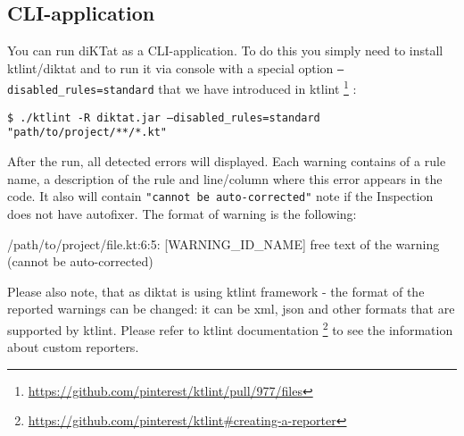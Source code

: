 \subsection{CLI-application}
You can run diKTat as a CLI-application. To do this you simply need to install ktlint/diktat and to run it via console with a special option \texttt{--disabled\_rules=standard} that we have introduced in ktlint \footnote{\url{https://github.com/pinterest/ktlint/pull/977/files}} :

\begin{center}
\texttt{\$ ./ktlint -R diktat.jar --disabled\_rules=standard "path/to/project/**/*.kt"}
\end{center}

After the run, all detected errors will displayed. Each warning contains of a rule name, a description of the rule and line/column where this error appears in the code. It also will contain \texttt{"cannot be auto-corrected"} note if the Inspection does not have autofixer. The format of warning is the following:

\begin{center}
/path/to/project/file.kt:6:5: [WARNING\_ID\_NAME] free text of the warning (cannot be auto-corrected)
\end{center}

Please also note, that as diktat is using ktlint framework - the format of the reported warnings can be changed: it can be xml, json and other formats that are supported by ktlint. Please refer to ktlint documentation \footnote{\url{https://github.com/pinterest/ktlint\#creating-a-reporter}} to see the information about custom reporters.

